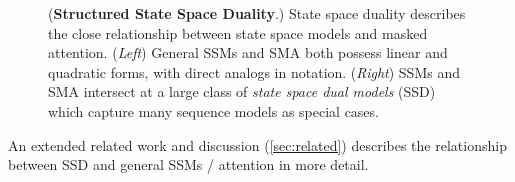 \begin{figure}
\begin{minipage}[c]{0.49\linewidth}
  \end{minipage}
  \captionsetup{type=figure}
  \caption{
    (\textbf{Structured State Space Duality}.)
    State space duality describes the close relationship between state space models and masked attention.
    (\emph{Left}) General SSMs and SMA both possess linear and quadratic forms, with direct analogs in notation.
    (\emph{Right}) SSMs and SMA intersect at a large class of \emph{state space dual models} (SSD) which capture many sequence models as special cases.
  }
  \label{fig:ssd}
\end{figure}

An extended related work and discussion (\cref{sec:related}) describes the relationship between SSD and general SSMs / attention in more detail.


